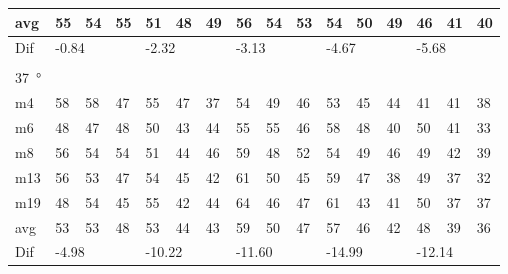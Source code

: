 \begin{table}[H]
\begin{tabular}{l|l|l|l|l|l|l|l|l|l|l|l|l|lll}
avg & 55     &  54    &  55    &  51    &  48    &   49   &  56    &  54     & 53     &  54     &  50    &   49   & \multicolumn{1}{l|}{46} & \multicolumn{1}{l|}{41}  &40  \\ \hline  
Dif & \multicolumn{3}{l|}{-0.84} & \multicolumn{3}{l|}{-2.32} & \multicolumn{3}{l|}{-3.13} & \multicolumn{3}{l|}{-4.67} & \multicolumn{3}{l}{-5.68}  \\ 
 \multicolumn{16}{l}{ } \\                         
\SI{37}{\degree}   & \multicolumn{3}{l|}{} & \multicolumn{3}{l|}{} & \multicolumn{3}{l|}{} & \multicolumn{3}{l|}{} & \multicolumn{3}{l}{}   \\  \hline
m4    &  58    &  58    & 47     & 55     &  47    &   37   &   54   &   49    &  46    &   53    &   45   &   44   & \multicolumn{1}{l|}{41} & \multicolumn{1}{l|}{41} & 38 \\
m6    &  48    &   47   &  48    & 50     &   43   &  44    &    55  &   55    &  46    &   58    &   48   &   40   & \multicolumn{1}{l|}{50} & \multicolumn{1}{l|}{41} & 33 \\
m8    &  56    &  54    & 54     &  51    &  44    &   46   &   59   &   48    &  52    &   54    &    49  &   46   & \multicolumn{1}{l|}{49} & \multicolumn{1}{l|}{42} & 39 \\
m13  &   56   & 53     &   47   & 54     &   45   &   42   &   61   &   50    &  45    &   59    &   47   &   38   & \multicolumn{1}{l|}{49} & \multicolumn{1}{l|}{37} & 32 \\
m19  &  48    &  54    &  45    &  55    &  42    &   44   &   64   &    46   &  47    &   61    &   43   &    41  & \multicolumn{1}{l|}{50} & \multicolumn{1}{l|}{37} & 37 \\ \hline
avg &  53    &   53   &  48    &  53    &  44    & 43     &  59    &   50    & 47     &   57    & 46     &   42   & \multicolumn{1}{l|}{48} & \multicolumn{1}{l|}{39}  &36  \\ \hline  
Dif & \multicolumn{3}{l|}{-4.98} & \multicolumn{3}{l|}{-10.22} & \multicolumn{3}{l|}{-11.60} & \multicolumn{3}{l|}{-14.99} & \multicolumn{3}{l}{-12.14}                              
\end{tabular}
\end{table}



